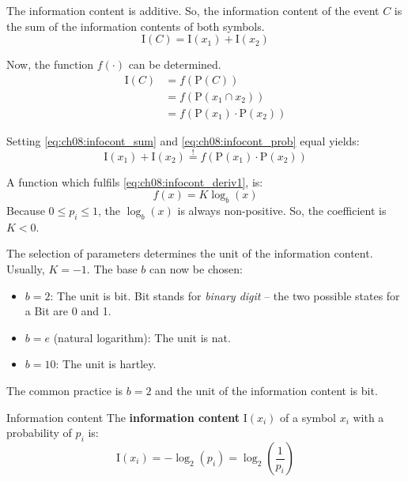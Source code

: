 \begin{refsection}
The information content is additive. So, the information content of the event $C$ is the sum of the information contents of both symbols.
\begin{equation}
	\mathrm{I}(C) = \mathrm{I}(x_1) + \mathrm{I}(x_2)
	\label{eq:ch08:infocont_sum}
\end{equation}

Now, the function $f(\cdot)$ can be determined.
\begin{equation}
	\begin{split}
		\mathrm{I}(C) &= f\left(\mathrm{P}(C)\right) \\
		 &= f\left(\mathrm{P}(x_1 \cap x_2)\right) \\
		 &= f\left(\mathrm{P}(x_1) \cdot \mathrm{P}(x_2)\right)
	\end{split}
	\label{eq:ch08:infocont_prob}
\end{equation}

Setting \eqref{eq:ch08:infocont_sum} and \eqref{eq:ch08:infocont_prob} equal yields:
\begin{equation}
	\mathrm{I}(x_1) + \mathrm{I}(x_2) \stackrel{!}{=} f\left(\mathrm{P}(x_1) \cdot \mathrm{P}(x_2)\right)
	\label{eq:ch08:infocont_deriv1}
\end{equation}

A function which fulfils \eqref{eq:ch08:infocont_deriv1}, is:
\begin{equation}
	f(x) = K \log_{b} (x)
\end{equation}
Because $0 \leq p_i \leq 1$, the $\log_{b} (x)$ is always non-positive. So, the coefficient is $K < 0$.

The selection of parameters determines the unit of the information content. Usually, $K = -1$. The base $b$ can now be chosen:
\begin{itemize}
	\item $b = 2$: The unit is \si{bit}. Bit stands for \emph{binary digit} -- the two possible states for a Bit are 0 and 1.
	\item $b = e$ (natural logarithm): The unit is \si{nat}.
	\item $b = 10$: The unit is \si{hartley}.
\end{itemize}
The common practice is $b = 2$ and the unit of the information content is \si{bit}.

\begin{definition}{Information content}
	The  \textbf{information content} $\mathrm{I}(x_i)$ of a symbol $x_i$ with a probability of $p_i$ is:
	\begin{equation}
		\mathrm{I}(x_i) = - \log_2 \left(p_i\right) = \log_2 \left(\frac{1}{p_i}\right)
		\label{eq:ch08:infocont}
	\end{equation}


\end{definition}
\end{refsection}
